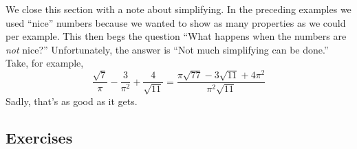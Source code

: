 We close this section with a note about simplifying.  In the preceding examples we used ``nice'' numbers because we wanted to show as many properties as we could per example. This then begs the question ``What happens when the numbers are \emph{not} nice?''  Unfortunately, the answer is ``Not much simplifying can be done.''  Take, for example,\[\frac{\sqrt{7}}{\pi} - \frac{3}{\pi^{2}} + \frac{4}{\sqrt{11}} = \frac{\pi\sqrt{77} - 3\sqrt{11} + 4\pi^{2}}{\pi^{2}\sqrt{11}}\]Sadly, that's as good as it gets.

\clearpage

\subsection{Exercises}



\closegraphsfile